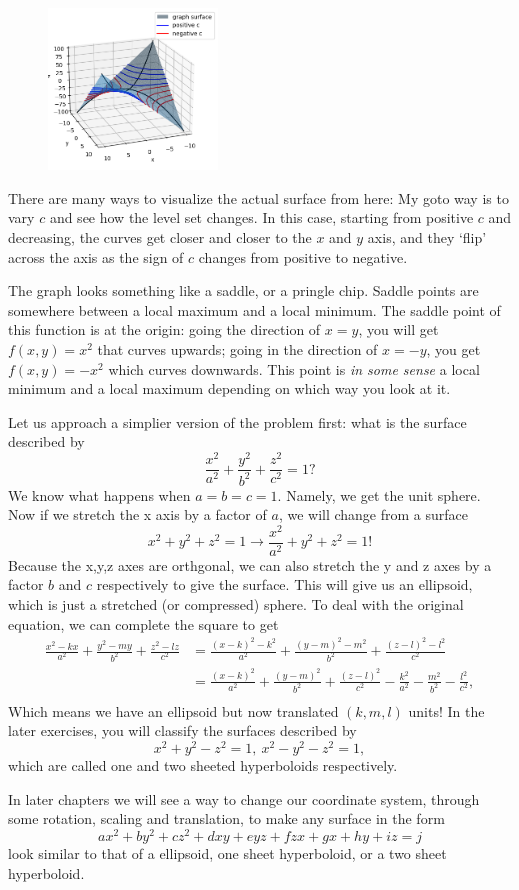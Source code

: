 \begin{figure}
    \centering
    \includegraphics[width=0.4\textwidth]{Rn_function/saddle.png}
\end{figure} There are many ways to visualize the actual surface from here: My goto way is to vary $c$ and see how the level set changes. In this case, starting from positive $c$ and decreasing, the curves get closer and closer to the $x$ and $y$ axis, and they `flip' across the axis as the sign of $c$ changes from positive to negative.

The graph looks something like a saddle, or a pringle chip. Saddle points are somewhere between a local maximum and a local minimum. The saddle point of this function is at the origin: going the direction of $x=y$, you will get $f(x,y)=x^2$ that curves upwards; going in the direction of $x=-y$, you get $f(x,y)=-x^2$ which curves downwards. This point is \textit{in some sense} a local minimum and a local maximum depending on which way you look at it.


Let us approach a simplier version of the problem first: what is the surface described by \[
    \frac{x^2}{a^2}+\frac{y^2}{b^2}+\frac{z^2}{c^2}=1?
\]
We know what happens when $a=b=c=1$. Namely, we get the unit sphere. Now if we stretch the x axis by a factor of $a$, we will change from a surface \[
    x^2+y^2+z^2=1 \to \frac{x^2}{a^2}+y^2+z^2=1!
\]
Because the x,y,z axes are orthgonal, we can also stretch the y and z axes by a factor $b$ and $c$ respectively to give the surface. This will give us an ellipsoid, which is just a stretched (or compressed) sphere. To deal with the original equation, we can complete the square to get \begin{align*}
    \frac{x^2-kx}{a^2}+\frac{y^2-my}{b^2}+\frac{z^2-lz}{c^2}&=  \frac{(x-k)^2-k^2}{a^2}+\frac{(y-m)^2-m^2}{b^2}+\frac{(z-l)^2-l^2}{c^2}\\
    &=\frac{(x-k)^2}{a^2}+\frac{(y-m)^2}{b^2}+\frac{(z-l)^2}{c^2} -\frac{k^2}{a^2}-\frac{m^2}{b^2}-\frac{l^2}{c^2}, \\
\end{align*}
Which means we have an ellipsoid but now translated $(k,m,l)$ units!
In the later exercises, you will classify the surfaces described by \[
    x^2+y^2-z^2=1, \ x^2-y^2-z^2=1,
\]
which are called one and two sheeted hyperboloids respectively. 

In later chapters we will see a way to change our coordinate system, through some rotation, scaling and translation, to make any surface in the form \[
    ax^2+by^2+cz^2+dxy+eyz+fzx+gx+hy+iz=j
\] look similar to that of a ellipsoid, one sheet hyperboloid, or a two sheet hyperboloid.
